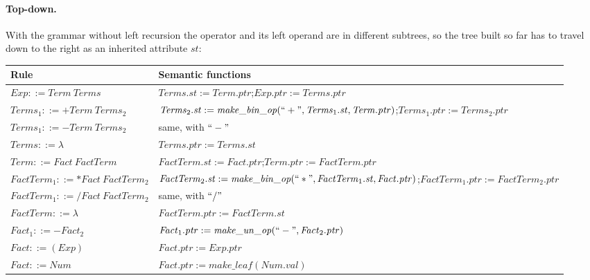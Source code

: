 \paragraph{Top-down.} With the grammar without left recursion the operator and
its left operand are in different subtrees, so the tree built so far has to
travel down to the right as an inherited attribute $\mathit{st}$:
\begin{center}
\small
\begin{tabular}{l >{\raggedright\arraybackslash}p{}}
  \toprule
  Rule & Semantic functions \\
  \midrule
  $\mathit{Exp} ::= \mathit{Term}\ \mathit{Terms}$ & $\mathit{Terms}.\mathit{st} := \mathit{Term}.\mathit{ptr}$;\newline $\mathit{Exp}.\mathit{ptr} := \mathit{Terms}.\mathit{ptr}$ \\
  $\mathit{Terms}_1 ::= + \mathit{Term}\ \mathit{Terms}_2$ & $\mathit{Terms}_2.\mathit{st} := \mathit{make\_bin\_op}(``+", \mathit{Terms}_1.\mathit{st}, \mathit{Term}.\mathit{ptr})$;\newline $\mathit{Terms}_1.\mathit{ptr} := \mathit{Terms}_2.\mathit{ptr}$ \\
  $\mathit{Terms}_1 ::= - \mathit{Term}\ \mathit{Terms}_2$ & same, with $``-"$ \\
  $\mathit{Terms} ::= \lambda$ & $\mathit{Terms}.\mathit{ptr} := \mathit{Terms}.\mathit{st}$ \\
  $\mathit{Term} ::= \mathit{Fact}\ \mathit{FactTerm}$ & $\mathit{FactTerm}.\mathit{st} := \mathit{Fact}.\mathit{ptr}$;\newline $\mathit{Term}.\mathit{ptr} := \mathit{FactTerm}.\mathit{ptr}$ \\
  $\mathit{FactTerm}_1 ::= * \mathit{Fact}\ \mathit{FactTerm}_2$ & $\mathit{FactTerm}_2.\mathit{st} := \mathit{make\_bin\_op}(``*", \mathit{FactTerm}_1.\mathit{st}, \mathit{Fact}.\mathit{ptr})$;\newline $\mathit{FactTerm}_1.\mathit{ptr} := \mathit{FactTerm}_2.\mathit{ptr}$ \\
  $\mathit{FactTerm}_1 ::= / \mathit{Fact}\ \mathit{FactTerm}_2$ & same, with $``/"$ \\
  $\mathit{FactTerm} ::= \lambda$ & $\mathit{FactTerm}.\mathit{ptr} := \mathit{FactTerm}.\mathit{st}$ \\
  $\mathit{Fact}_1 ::= - \mathit{Fact}_2$ & $\mathit{Fact}_1.\mathit{ptr} := \mathit{make\_un\_op}(``-", \mathit{Fact}_2.\mathit{ptr})$ \\
  $\mathit{Fact} ::= (\mathit{Exp})$ & $\mathit{Fact}.\mathit{ptr} := \mathit{Exp}.\mathit{ptr}$ \\
  $\mathit{Fact} ::= \mathit{Num}$ & $\mathit{Fact}.\mathit{ptr} := \mathit{make\_leaf}(\mathit{Num}.\mathit{val})$ \\
  \bottomrule
\end{tabular}
\end{center}
